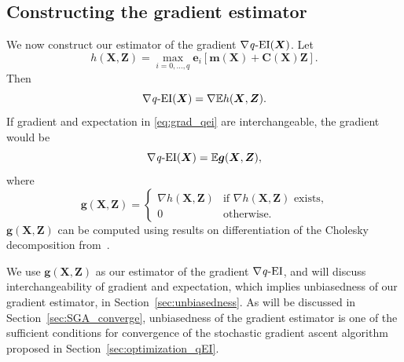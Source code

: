 \documentclass[paper=letter]{scrartcl}
\newcommand{\qEI}{\text{\textit q-EI}}
\begin{document}
\subsection{Constructing the gradient estimator} \label{sec:gradient_estimator}
We now construct our estimator of the gradient $\nabla \qEI(\bm{X})$.
Let 
\begin{equation} \label{eq:def_f}
h(\bm{X}, \bm{Z}) = \max_{i=0,\ldots,q} \bm{e}_i \left[ \bm{m}(\bm{X}) +\bm{C}(\bm{X}) \bm{Z} \right].
\end{equation}
Then
\begin{equation}
\nabla \qEI(\bm{X}) = \nabla \mathbb{E} h(\bm{X}, \bm{Z}).
\label{eq:grad_qei}
\end{equation}
If gradient and expectation in \eqref{eq:grad_qei} are interchangeable,
the gradient would be
\begin{equation}
\nabla \qEI(\bm{X}) = \mathbb{E}  \bm{g}(\bm{X}, \bm{Z}),
\label{eq:unbiasedness}
\end{equation}
where
\begin{equation} \label{eq:gradient_def}
\bm{g}(\bm{X}, \bm{Z})= \begin{cases} \nabla h(\bm{X},\bm{Z})  & \text{if } \nabla h(\bm{X}, \bm{Z})  \text{ exists,} \\ 0 & \text{otherwise.} \end{cases}
\end{equation}
$\bm{g}(\bm{X}, \bm{Z})$ can be computed using results on differentiation of the Cholesky decomposition from~\cite{smith1995differentiation}.

We use $\bm{g}(\bm{X}, \bm{Z})$ as our estimator of the gradient $\nabla \qEI$, and will
discuss interchangeability of gradient and expectation, which implies unbiasedness of our gradient estimator, in Section~\ref{sec:unbiasedness}.
As will be discussed in Section~\ref{sec:SGA_converge}, unbiasedness of the gradient estimator is one of the sufficient conditions for convergence
of the stochastic gradient ascent algorithm proposed in Section~\ref{sec:optimization_qEI}.
\end{document}

